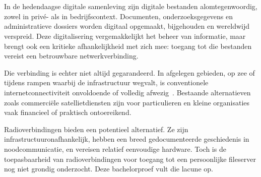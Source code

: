 
\chapter{}%
\label{ch:inleiding}

In de hedendaagse digitale samenleving zijn digitale bestanden alomtegenwoordig, zowel in privé- als
in bedrijfscontext. Documenten, onderzoeksgegevens en administratieve dossiers worden digitaal
opgemaakt, bijgehouden en wereldwijd verspreid. Deze digitalisering vergemakkelijkt het beheer van
informatie, maar brengt ook een kritieke afhankelijkheid met zich mee: toegang tot die bestanden
vereist een betrouwbare netwerkverbinding.

Die verbinding is echter niet altijd gegarandeerd. In afgelegen gebieden, op zee of tijdens
rampen waarbij de infrastructuur wegvalt, is conventionele internetconnectiviteit onvoldoende of
volledig afwezig~\autocite{Xia2022}. Bestaande alternatieven zoals commerciële satellietdiensten
zijn voor particulieren en kleine organisaties vaak financieel of praktisch ontoereikend.

Radioverbindingen bieden een potentieel alternatief. Ze zijn infrastructuuronafhankelijk, hebben
een breed gedocumenteerde geschiedenis in noodcommunicatie, en vereisen relatief eenvoudige
hardware. Toch is de toepasbaarheid van radioverbindingen voor toegang tot een persoonlijke
fileserver nog niet grondig onderzocht. Deze bachelorproef vult die lacune op.

\section{}%
\label{sec:probleemstelling}


